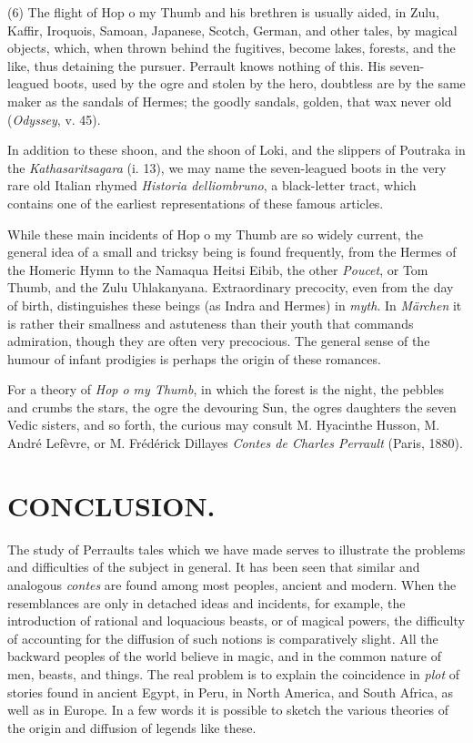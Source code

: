 \documentclass[14pt,a4paper]{memoir}
\newcommand{\notesection}[1]{%
  \addtonotes{\protect\par\protect\vspace{2ex}\protect\noindent\textbf{#1}\protect\par\protect\vspace{1ex}}%
}
\begin{document}
{{(6) The flight of Hop o\textquotesingle{} my Thumb and his brethren is
usually aided, in Zulu, Kaffir, Iroquois, Samoan, Japanese, Scotch,
German, and other tales, by magical objects, which, when thrown behind
the fugitives, become lakes, forests, and the like, thus detaining the
pursuer. Perrault knows nothing of this. His seven-leagued boots, used
by the ogre and stolen by the hero, doubtless are by the same maker as
the sandals of Hermes; the goodly sandals, golden, that wax never old
(\emph{Odyssey}, v. 45).

In addition to these shoon, and the shoon of Loki, and the slippers of
Poutraka in the \emph{Kathasaritsagara} (i. 13), we may name the
seven-leagued boots in the very rare old Italian rhymed \emph{Historia
delliombruno}, a black-letter tract, which contains one of the earliest
representations of these famous articles.

While these main incidents of Hop o\textquotesingle{} my Thumb are so
widely current, the general idea of a small and tricksy being is found
frequently, from the Hermes of the Homeric Hymn to the Namaqua Heitsi
Eibib, the other \emph{Poucet}, or Tom Thumb, and the Zulu Uhlakanyana.
Extraordinary precocity, even from the day of birth, distinguishes these
beings (as Indra and Hermes) in \emph{myth}. In \emph{Märchen} it is
rather their smallness and astuteness than their youth that commands
admiration, though they are often very precocious. The general sense of
the humour of \textquotesingle infant prodigies\textquotesingle{} is
perhaps the origin of these romances.

For a theory of \emph{Hop o\textquotesingle{} my Thumb}, in which the
forest is the night, the pebbles and crumbs the stars, the ogre the
devouring Sun, the ogre\textquotesingle s daughters \textquotesingle the
seven Vedic sisters,\textquotesingle{} and so forth, the curious may
consult M. Hyacinthe Husson, M. André Lefèvre, or M. Frédérick
Dillaye\textquotesingle s \emph{Contes de Charles Perrault} (Paris,
1880).

\section{CONCLUSION.}
\notesection{CONCLUSION.}

The study of Perrault\textquotesingle s tales which we have made serves
to illustrate the problems and difficulties of the subject in general.
It has been seen that similar and analogous \emph{contes} are found
among most peoples, ancient and modern. When the resemblances are only
in detached ideas and incidents, for example, the introduction of
rational and loquacious beasts, or of magical powers, the difficulty of
accounting for the diffusion of such notions is comparatively slight.
All the backward peoples of the world believe in magic, and in the
common nature of men, beasts, and things. The real problem is to explain
the coincidence in \emph{plot} of stories found in ancient Egypt, in
Peru, in North America, and South Africa, as well as in Europe. In a few
words it is possible to sketch the various theories of the origin and
diffusion of legends like these.

}}
\end{document}
